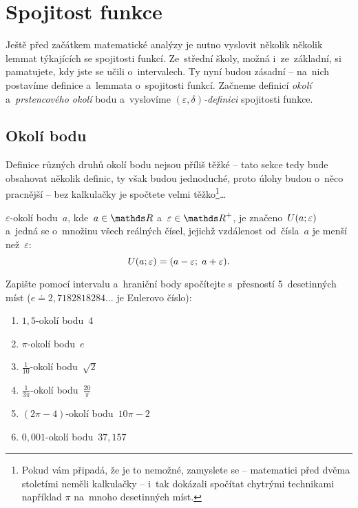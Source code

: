 \section{Spojitost funkce}
\label{sec:limita-spojitost-fce}

Ještě před začátkem matematické analýzy je nutno vyslovit několik několik lemmat
týkajících se spojitosti funkcí.
Ze~střední školy, možná i~ze~základní, si pamatujete, kdy jste se učili o~intervalech.
Ty nyní budou zásadní -- na~nich postavíme definice a~lemmata o~spojitosti funkcí.
Začneme definicí \emph{okolí} a~\emph{prstencového okolí} bodu a~vyslovíme
\emph{${(\varepsilon, \delta)}$-definici} spojitosti funkce.

\subsection{Okolí bodu}
\label{subsec:limita-spojitost-okoli}

Definice různých druhů okolí bodu nejsou příliš těžké -- tato sekce tedy bude
obsahovat několik definic, ty však budou jednoduché, proto úlohy budou o~něco
pracnější -- bez kalkulačky je spočtete velmi těžko\footnote{Pokud vám připadá, že je
to nemožné, zamyslete se -- matematici před dvěma stoletími neměli kalkulačky --
i~tak dokázali spočítat chytrými technikami například $\pi$ na~mnoho desetinných
míst.}\ldots

\begin{definition}
    $\varepsilon$-okolí bodu~$a$, kde~${a \in \reals}$
    a~${\varepsilon \in \positive{\reals}}$, je značeno~${U(a; \varepsilon)}$
    a~jedná se o~množinu všech reálných čísel, jejichž vzdálenost od~čísla~$a$ je
    menší než~$\varepsilon$:
    \begin{equation*}
        U(a; \varepsilon) = (a - \varepsilon;\; a + \varepsilon).
    \end{equation*}
\end{definition}

\begin{exercise}
    Zapište pomocí intervalu a~hraniční body spočítejte s~přesností 5~desetinných
    míst (${e \doteq 2,7182818284\dots}$ je Eulerovo číslo):
    \begin{multicols}{2}
        \begin{enumerate}[label=(\alph*)]
            \item $1,5$-okolí bodu~4
            \item $\pi$-okolí bodu~$e$
            \item $\frac{1}{10}$-okolí bodu~$\sqrt{2}$
            \item $\frac{1}{3\pi}$-okolí bodu~$\frac{20}{\pi}$
            \item ${(2\pi - 4)}$-okolí bodu~${10\pi - 2}$
            \item $0,001$-okolí bodu~$37,157$
        \end{enumerate}
    \end{multicols}
\end{exercise}

